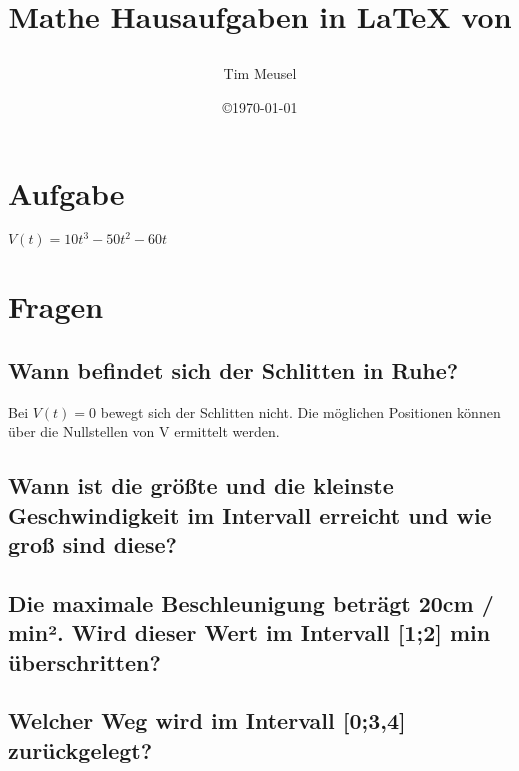 \documentclass[a4paper,11pt]{scrartcl}
\author{Tim Meusel}
\title{Mathe Hausaufgaben in \LaTeX{} von \author{}}
\date{\copyright\today}
\begin{document}
\maketitle

\section{Aufgabe}

$V(t) = 10t^3 - 50t^2 - 60t$

\section{Fragen}

\subsection{Wann befindet sich der Schlitten in Ruhe?}
Bei $V(t) = 0$ bewegt sich der Schlitten nicht. Die möglichen Positionen können
über die Nullstellen von V ermittelt werden.

\subsection{Wann ist die größte und die kleinste Geschwindigkeit im Intervall erreicht und wie groß sind diese?}

\subsection{Die maximale Beschleunigung beträgt 20cm / min². Wird dieser Wert im Intervall [1;2] min überschritten?
}
\subsection{Welcher Weg wird im Intervall [0;3,4] zurückgelegt?}
\end{document}
